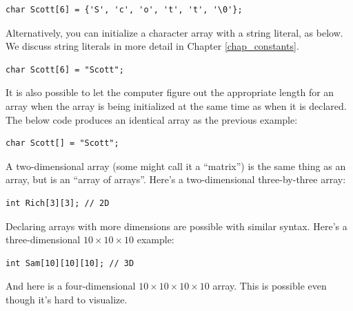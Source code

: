 \noindent\begin{minipage}{\linewidth}\begin{lstlisting}
char Scott[6] = {'S', 'c', 'o', 't', 't', '\0'};	
\end{lstlisting}\end{minipage}

Alternatively, you can initialize a character array with a string literal, as below. 
We discuss string literals in more detail in Chapter \ref{chap_constants}.

\noindent\begin{minipage}{\linewidth}\begin{lstlisting}
char Scott[6] = "Scott";	
\end{lstlisting}\end{minipage}

It is also possible to let the computer figure out the appropriate length for an array when the array is being initialized at the same time as when it is declared. 
The below code produces an identical array as the previous example:

\noindent\begin{minipage}{\linewidth}\begin{lstlisting}
char Scott[] = "Scott";	
\end{lstlisting}\end{minipage}


A two-dimensional array (some might call it a ``matrix'') is the same thing as an array, but is an ``array of arrays''.
Here's a two-dimensional three-by-three array:

\noindent\begin{minipage}{\linewidth}\begin{lstlisting}
int Rich[3][3]; // 2D
\end{lstlisting}\end{minipage}

Declaring arrays with more dimensions are possible with similar syntax. 
Here's a three-dimensional $10\times10\times10$ example:

\noindent\begin{minipage}{\linewidth}\begin{lstlisting}
int Sam[10][10][10]; // 3D
\end{lstlisting}\end{minipage}

And here is a four-dimensional $10\times10\times10\times10$ array. 
This is possible even though it's hard to visualize.

